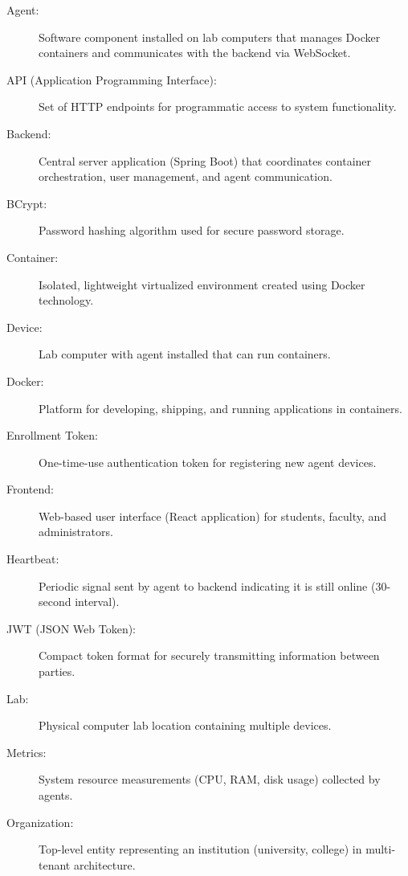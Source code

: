 \documentclass[12pt,a4paper]{article}
\begin{document}
\begin{description}
    \item[Agent:] Software component installed on lab computers that manages Docker containers and communicates with the backend via WebSocket.
    
    \item[API (Application Programming Interface):] Set of HTTP endpoints for programmatic access to system functionality.
    
    \item[Backend:] Central server application (Spring Boot) that coordinates container orchestration, user management, and agent communication.
    
    \item[BCrypt:] Password hashing algorithm used for secure password storage.
    
    \item[Container:] Isolated, lightweight virtualized environment created using Docker technology.
    
    \item[Device:] Lab computer with agent installed that can run containers.
    
    \item[Docker:] Platform for developing, shipping, and running applications in containers.
    
    \item[Enrollment Token:] One-time-use authentication token for registering new agent devices.
    
    \item[Frontend:] Web-based user interface (React application) for students, faculty, and administrators.
    
    \item[Heartbeat:] Periodic signal sent by agent to backend indicating it is still online (30-second interval).
    
    \item[JWT (JSON Web Token):] Compact token format for securely transmitting information between parties.
    
    \item[Lab:] Physical computer lab location containing multiple devices.
    
    \item[Metrics:] System resource measurements (CPU, RAM, disk usage) collected by agents.
    
    \item[Organization:] Top-level entity representing an institution (university, college) in multi-tenant architecture.
    

\end{description}
\end{document}
